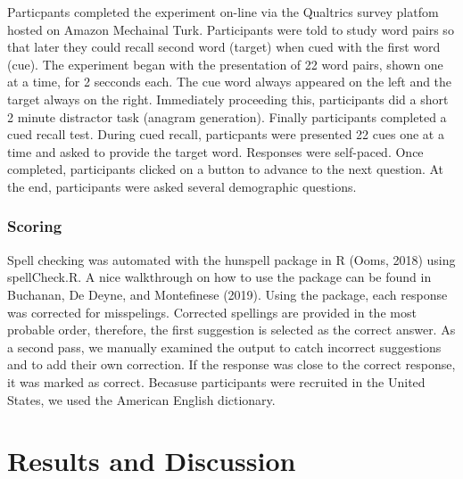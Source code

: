 \documentclass[english,doc]{apa6}
\begin{document}
Particpants completed the experiment on-line via the Qualtrics survey platfom hosted on Amazon Mechainal Turk. Participants were told to study word pairs so that later they could recall second word (target) when cued with the first word (cue). The experiment began with the presentation of 22 word pairs, shown one at a time, for 2 secconds each. The cue word always appeared on the left and the target always on the right. Immediately proceeding this, participants did a short 2 minute distractor task (anagram generation). Finally participants completed a cued recall test. During cued recall, particpants were presented 22 cues one at a time and asked to provide the target word. Responses were self-paced. Once completed, participants clicked on a button to advance to the next question. At the end, participants were asked several demographic questions.

\hypertarget{scoring}{%
\subsubsection{Scoring}\label{scoring}}

Spell checking was automated with the hunspell package in R (Ooms, 2018) using spellCheck.R. A nice walkthrough on how to use the package can be found in Buchanan, De Deyne, and Montefinese (2019). Using the package, each response was corrected for misspelings. Corrected spellings are provided in the most probable order, therefore, the first suggestion is selected as the correct answer. As a second pass, we manually examined the output to catch incorrect suggestions and to add their own correction. If the response was close to the correct response, it was marked as correct. Becasuse participants were recruited in the United States, we used the American English dictionary.

\hypertarget{results-and-discussion}{%
\section{Results and Discussion}\label{results-and-discussion}}
\end{document}
